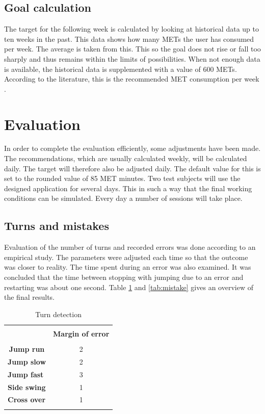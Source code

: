 \documentclass[twocolumn]{phdsymp} %
\begin{document}
\subsection{Goal calculation}
The target for the following week is calculated by looking at historical data up to ten weeks in the past. This data shows how many METs the user has consumed per week. The average is taken from this. This so the goal does not rise or fall too sharply and thus remains within the limits of possibilities. When not enough data is available, the historical data is supplemented with a value of 600 METs. According to the literature, this is the recommended MET consumption per week \cite{ref21}.

\section{Evaluation}
In order to complete the evaluation efficiently, some adjustments have been made. The recommendations, which are usually calculated weekly, will be calculated daily. The target will therefore also be adjusted daily. The default value for this is set to the rounded value of 85 MET minutes. Two test subjects will use the designed application for several days. This in such a way that the final working conditions can be simulated. Every day a number of sessions will take place. 

\subsection{Turns and mistakes}
Evaluation of the number of turns and recorded errors was done according to an empirical study. The parameters were adjusted each time so that the outcome was closer to reality. The time spent during an error was also examined. It was concluded that the time between stopping with jumping due to an error and restarting was about one second. Table \ref{tab:turns} and  \ref{tab:mistake} gives an overview of the final results.

\begin{table}[!htpd]
    \centering
    \begin{tabular}{lc}
    \hline \\
    \multicolumn{1}{c}{\textbf{}}          & \textbf{Margin of error} &\\
     \hline \\
    \multicolumn{1}{c}{\textbf{Jump run}}  & 2                    &\\
    \multicolumn{1}{c}{\textbf{Jump slow}} & 2                    &\\
    \textbf{Jump fast}                     & 3                    &\\
    \textbf{Side swing}                    & 1                   & \\
    \textbf{Cross over}                    & 1  & \\
 \hline \\
    \end{tabular}
    \caption{Turn detection}
    \label{tab:turns}
\end{table}
\end{document}
